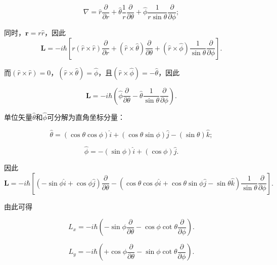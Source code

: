 \begin{equation}\label{eq:4.123}
	\nabla = \hat{r}\frac{\partial}{\partial r} + \hat{\theta}\frac{1}{r}\frac{\partial}{\partial \theta} + \hat{\phi}\frac{1}{r\sin\theta}\frac{\partial}{\partial \phi};
\end{equation}


同时，$\mathbf{r} = r\hat{r}$，因此
\[
\mathbf{L} = -i\hbar \left[ r\left(\hat{r} \times \hat{r}\right)\frac{\partial}{\partial r} + \left(\hat{r} \times \hat{\theta}\right)\frac{\partial}{\partial \theta} + \left(\hat{r} \times \hat{\phi}\right)\frac{1}{\sin\theta}\frac{\partial}{\partial \phi} \right].
\]

而$\left(\hat{r} \times \hat{r}\right) = 0$，$\left(\hat{r} \times \hat{\theta}\right) = \hat{\phi}$，且$\left(\hat{r} \times \hat{\phi}\right) = -\hat{\theta}$，因此

\begin{equation}\label{eq:4.124}
	\mathbf{L} = -i\hbar \left( \hat{\phi}\frac{\partial}{\partial \theta} - \hat{\theta}\frac{1}{\sin\theta}\frac{\partial}{\partial \phi} \right).
\end{equation}


单位矢量$\hat{\theta}$和$\hat{\phi}$可分解为直角坐标分量：

\begin{equation}\label{eq:4.125}
	\hat{\theta} = (\cos\theta \cos\phi)\hat{i} + (\cos\theta \sin\phi)\hat{j} - (\sin\theta)\hat{k};
\end{equation}

\begin{equation}\label{eq:4.126}
	\hat{\phi} = -(\sin\phi)\hat{i} + (\cos\phi)\hat{j}.
\end{equation}


因此
\[
\mathbf{L} = -i\hbar \left[ \left(-\sin\phi \hat{i} + \cos\phi \hat{j}\right)\frac{\partial}{\partial \theta} - \left( \cos\theta \cos\phi \hat{i} + \cos\theta \sin\phi \hat{j} - \sin\theta \hat{k} \right)\frac{1}{\sin\theta}\frac{\partial}{\partial \phi} \right].
\]

由此可得

\begin{equation}\label{eq:4.127}
	L_x = -i\hbar \left( -\sin\phi \frac{\partial}{\partial \theta} - \cos\phi \cot\theta \frac{\partial}{\partial \phi} \right).
\end{equation}

\begin{equation}\label{eq:4.128}
	L_y = -i\hbar \left( +\cos\phi \frac{\partial}{\partial \theta} - \sin\phi \cot\theta \frac{\partial}{\partial \phi} \right).
\end{equation}

